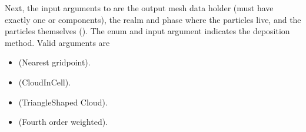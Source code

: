 \documentclass[letterpaper,10pt,english]{sphinxmanual}
\begin{document}
\sphinxAtStartPar
Next, the input arguments to  are the output mesh data holder (must have exactly one or  components), the realm and phase where the particles live, and the particles themselves ().
The enum  and input argument  indicates the deposition method.
Valid arguments are
\begin{itemize}
\item {} 
\sphinxAtStartPar
{} (Nearest grid\sphinxhyphen{}point).

\item {} 
\sphinxAtStartPar
{} (Cloud\sphinxhyphen{}In\sphinxhyphen{}Cell).

\item {} 
\sphinxAtStartPar
{} (Triangle\sphinxhyphen{}Shaped Cloud).

\item {} 
\sphinxAtStartPar
{}  (Fourth order weighted).

\end{itemize}
\end{document}
